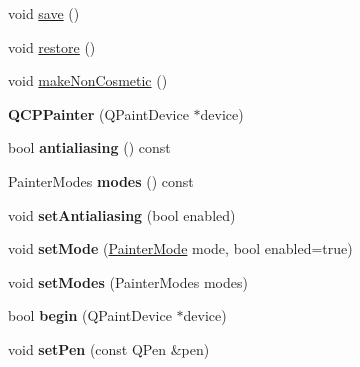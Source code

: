 \begin{DoxyCompactItemize}
\item 
void \hyperlink{class_q_c_p_painter_a8fd6821ee6fecbfa04444c9062912abd}{save} ()
\item 
void \hyperlink{class_q_c_p_painter_a64908e6298d5bbd83457dc987cc3a022}{restore} ()
\item 
void \hyperlink{class_q_c_p_painter_a7e63fbcf47e35c6f2ecd11b8fef7c7d8}{make\+Non\+Cosmetic} ()
\item 
{\bfseries Q\+C\+P\+Painter} (Q\+Paint\+Device $\ast$device)\hypertarget{class_q_c_p_painter_ae58dbb1795ddc4351ab324dc9898aa22}{}\label{class_q_c_p_painter_ae58dbb1795ddc4351ab324dc9898aa22}

\item 
bool {\bfseries antialiasing} () const \hypertarget{class_q_c_p_painter_a13370d7996315a7150be2fc868da3d4a}{}\label{class_q_c_p_painter_a13370d7996315a7150be2fc868da3d4a}

\item 
Painter\+Modes {\bfseries modes} () const \hypertarget{class_q_c_p_painter_a99b89eaf5363faaa1e1e6162856f436c}{}\label{class_q_c_p_painter_a99b89eaf5363faaa1e1e6162856f436c}

\item 
void {\bfseries set\+Antialiasing} (bool enabled)\hypertarget{class_q_c_p_painter_aaba1deb9188244d9ea65b035112b4d05}{}\label{class_q_c_p_painter_aaba1deb9188244d9ea65b035112b4d05}

\item 
void {\bfseries set\+Mode} (\hyperlink{class_q_c_p_painter_a156cf16444ff5e0d81a73c615fdb156d}{Painter\+Mode} mode, bool enabled=true)\hypertarget{class_q_c_p_painter_af6b1f7d2bbc548b10aa55d8b6ad49577}{}\label{class_q_c_p_painter_af6b1f7d2bbc548b10aa55d8b6ad49577}

\item 
void {\bfseries set\+Modes} (Painter\+Modes modes)\hypertarget{class_q_c_p_painter_a5fac93adc29c7c4dea9f3e171e9e635e}{}\label{class_q_c_p_painter_a5fac93adc29c7c4dea9f3e171e9e635e}

\item 
bool {\bfseries begin} (Q\+Paint\+Device $\ast$device)\hypertarget{class_q_c_p_painter_a0a41146ccd619dceab6e25ec7b46b044}{}\label{class_q_c_p_painter_a0a41146ccd619dceab6e25ec7b46b044}

\item 
void {\bfseries set\+Pen} (const Q\+Pen \&pen)\hypertarget{class_q_c_p_painter_af9c7a4cd1791403901f8c5b82a150195}{}\label{class_q_c_p_painter_af9c7a4cd1791403901f8c5b82a150195}


\end{DoxyCompactItemize}
